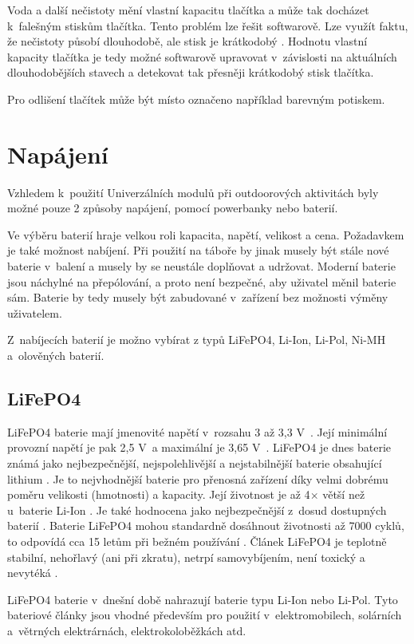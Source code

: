 Voda a další nečistoty mění vlastní kapacitu tlačítka a může tak docházet k~falešným stiskům tlačítka. Tento problém lze řešit softwarově. 
Lze využít faktu, že nečistoty působí dlouhodobě, ale stisk je krátkodobý \cite{PrincipKapTl}. Hodnotu vlastní kapacity tlačítka je tedy
možné softwarově upravovat v~závislosti na aktuálních dlouhodobějších stavech a detekovat tak přesněji krátkodobý stisk tlačítka.

Pro odlišení tlačítek může být místo označeno například barevným potiskem. 

\section{Napájení}
Vzhledem k~použití Univerzálních modulů při outdoorových aktivitách byly možné pouze 2 způsoby napájení, pomocí powerbanky nebo baterií. 

Ve výběru baterií hraje velkou roli kapacita, napětí, velikost a cena. Požadavkem je také možnost nabíjení. Při použití na táboře by jinak musely být stále 
nové baterie v~balení a musely by se neustále doplňovat a udržovat. Moderní baterie jsou náchylné na přepólování, a proto není bezpečné, aby uživatel měnil baterie sám. Baterie by tedy musely být zabudované v~zařízení 
bez možnosti výměny uživatelem. 

Z~nabíjecích baterií je možno vybírat z typů LiFePO4, Li-Ion, Li-Pol, Ni-MH a~olověných baterií.

\subsection{LiFePO4}
LiFePO4 baterie mají jmenovité napětí v~rozsahu 3 až 3,3 V~\cite{LiFePO4_malina}. Její minimální provozní napětí je pak 2,5 V~a maximální je 3,65 V~\cite{LiFePO4_malina}.
LiFePO4 je dnes baterie známá jako nejbezpečnější, nejspolehlivější a nejstabilnější baterie obsahující lithium \cite{LiFePO4_malina}. Je to nejvhodnější baterie pro 
přenosná zařízení díky velmi dobrému poměru velikosti (hmotnosti) a kapacity. Její životnost je až 4$\times$ větší než u~baterie Li-Ion \cite{LiFePO4_malina}. Je také hodnocena
jako nejbezpečnější z~dosud dostupných baterií \cite{LiFePO4_malina}. Baterie LiFePO4 mohou standardně dosáhnout životnosti až 7000 cyklů, to odpovídá cca 15 letům při bežném
používání \cite{LiFePO4_malina}. Článek LiFePO4 je teplotně stabilní, nehořlavý (ani při zkratu), netrpí samovybíjením, není toxický a nevytéká \cite{LiFePO4_malina}.

LiFePO4 baterie v~dnešní době nahrazují baterie typu Li-Ion nebo Li-Pol.
Tyto bateriové články jsou vhodné především pro použití v~elektromobilech, solárních a~větrných elektrárnách, elektrokoloběžkách atd. 

